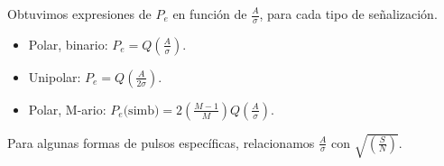 Obtuvimos expresiones de $P_e$ en función de $\frac{A}{\sigma}$, para cada tipo de señalización.
 \begin{itemize}
        \item Polar, binario:
        $P_e=Q\left(\frac{A}{\sigma}\right)$.
        \item Unipolar: $P_e=Q\left(\frac{A}{2\sigma}\right)$.
        \item Polar, M-ario:
        $P_e\text{(simb)}=2\left(\frac{M-1}{M}\right)Q\left(\frac{A}{\sigma}\right)$.
    \end{itemize}

Para algunas formas de pulsos específicas, relacionamos
$\frac{A}{\sigma}$ con $\sqrt{\left(\frac{S}{N}\right)}$.
